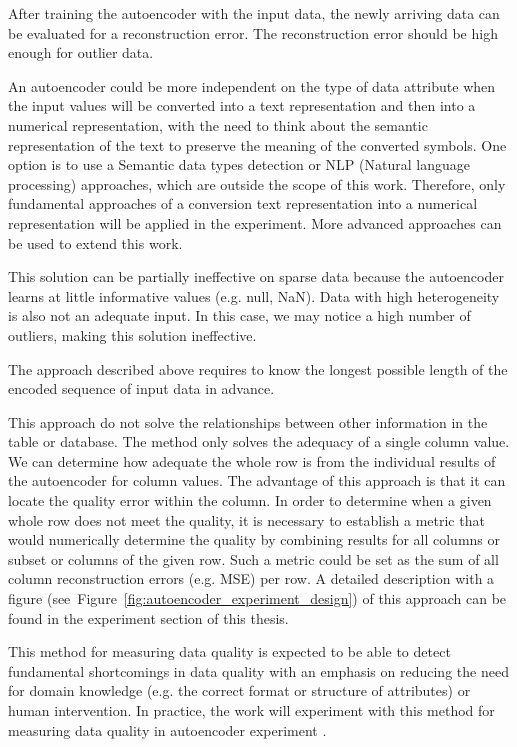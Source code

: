 		After training the autoencoder with the input data, the newly arriving data can be evaluated for a reconstruction error. The reconstruction error should be high enough for outlier data.
		
		An autoencoder could be more independent on the type of data attribute when the input values will be converted into a text representation and then into a numerical representation, with the need to think about the semantic representation of the text to preserve the meaning of the converted symbols. One option is to use a Semantic data types detection  or NLP (Natural language processing) approaches, which are outside the scope of this work. Therefore, only fundamental approaches of a conversion text representation into a numerical representation will be applied in the experiment. More advanced approaches can be used to extend this work.
		
		This solution can be partially ineffective on sparse data because the autoencoder learns at little informative values (e.g. null, NaN). Data with high heterogeneity is also not an adequate input. In this case, we may notice a high number of outliers, making this solution ineffective.

		The approach described above requires to know the longest possible length of the encoded sequence of input data in advance.

		This approach do not solve the relationships between other information in the table or database. The method only solves the adequacy of a single column value. We can determine how adequate the whole row is from the individual results of the autoencoder for column values. The advantage of this approach is that it can locate the quality error within the column. In order to determine when a given whole row does not meet the quality, it is necessary to establish a metric that would numerically determine the quality by combining results for all columns or subset or columns of the given row. Such a metric could be set as the sum of all column reconstruction errors (e.g. MSE) per row. A detailed description with a figure (see~Figure~\ref{fig:autoencoder_experiment_design}) of this approach can be found in the experiment section of this thesis.
		
		This method for measuring data quality is expected to be able to detect fundamental shortcomings in data quality with an emphasis on reducing the need for domain knowledge (e.g. the correct format or structure of attributes) or human intervention. In practice, the work will experiment with this method for measuring data quality in autoencoder experiment .
		
